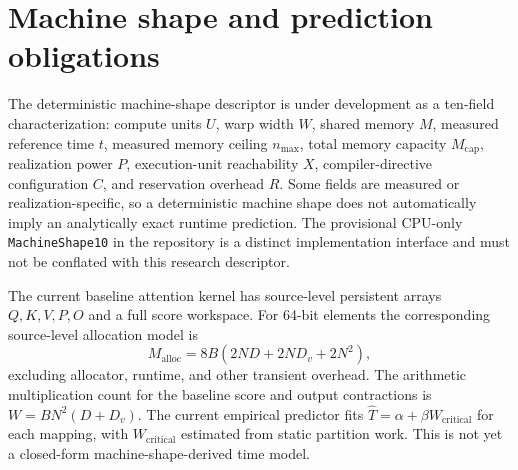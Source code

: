\documentclass[11pt]{article}
\begin{document}
\section{Machine shape and prediction obligations}
The deterministic machine-shape descriptor is under development as a ten-field characterization: compute units $U$, warp width $W$, shared memory $M$, measured reference time $t$, measured memory ceiling $n_{\max}$, total memory capacity $M_{\mathrm{cap}}$, realization power $P$, execution-unit reachability $X$, compiler-directive configuration $C$, and reservation overhead $R$. Some fields are measured or realization-specific, so a deterministic machine shape does not automatically imply an analytically exact runtime prediction. The provisional CPU-only \texttt{MachineShape10} in the repository is a distinct implementation interface and must not be conflated with this research descriptor.

The current baseline attention kernel has source-level persistent arrays $Q,K,V,P,O$ and a full score workspace. For 64-bit elements the corresponding source-level allocation model is
\begin{equation}M_{\mathrm{alloc}}=8B(2ND+2ND_v+2N^2),\end{equation}
excluding allocator, runtime, and other transient overhead. The arithmetic multiplication count for the baseline score and output contractions is $W=B N^2(D+D_v)$. The current empirical predictor fits $\widehat{T}=\alpha+\beta W_{\mathrm{critical}}$ for each mapping, with $W_{\mathrm{critical}}$ estimated from static partition work. This is not yet a closed-form machine-shape-derived time model.
\end{document}
